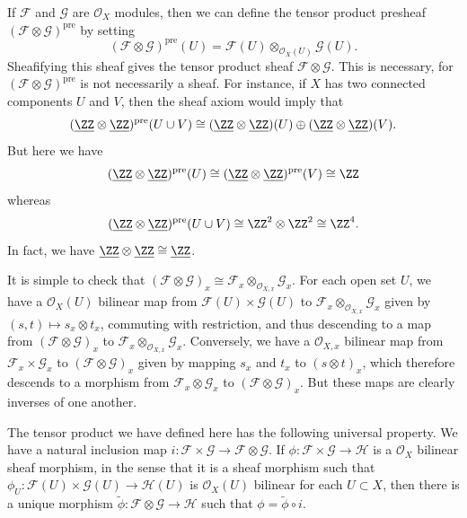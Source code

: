 \begin{example}
    If $\mathcal{F}$ and $\mathcal{G}$ are $\mathcal{O}_X$ modules, then we can define the tensor product presheaf $(\mathcal{F} \otimes \mathcal{G})^{\text{pre}}$ by setting
    \[ (\mathcal{F} \otimes \mathcal{G})^{\text{pre}}(U) = \mathcal{F}(U) \otimes_{\mathcal{O}_X(U)} \mathcal{G}(U). \]
    Sheafifying this sheaf gives the tensor product sheaf $\mathcal{F} \otimes \mathcal{G}$. This is necessary, for $(\mathcal{F} \otimes \mathcal{G})^{\text{pre}}$ is not necessarily a sheaf. For instance, if $X$ has two connected components $U$ and $V$, then the sheaf axiom would imply that
    \[ (\underline{\ZZ} \otimes \underline{\ZZ})^{\text{pre}}(U \cup V) \cong (\underline{\ZZ} \otimes \underline{\ZZ})(U) \oplus (\underline{\ZZ} \otimes \underline{\ZZ})(V). \]
    But here we have
    \[ (\underline{\ZZ} \otimes \underline{\ZZ})^{\text{pre}}(U) \cong (\underline{\ZZ} \otimes \underline{\ZZ})^{\text{pre}}(V) \cong \ZZ \]
    whereas
    \[ (\underline{\ZZ} \otimes \underline{\ZZ})^{\text{pre}}(U \cup V) \cong \ZZ^2 \otimes \ZZ^2 \cong \ZZ^4. \]
    In fact, we have $\underline{\ZZ} \otimes \underline{\ZZ} \cong \underline{\ZZ}$.

    It is simple to check that $(\mathcal{F} \otimes \mathcal{G})_x \cong \mathcal{F}_x \otimes_{\mathcal{O}_{X,x}} \mathcal{G}_x$. For each open set $U$, we have a $\mathcal{O}_X(U)$ bilinear map from $\mathcal{F}(U) \times \mathcal{G}(U)$ to $\mathcal{F}_x \otimes_{\mathcal{O}_{X,x}} \mathcal{G}_x$ given by $(s,t) \mapsto s_x \otimes t_x$, commuting with restriction, and thus descending to a map from $(\mathcal{F} \otimes \mathcal{G})_x$ to $\mathcal{F}_x \otimes_{\mathcal{O}_{X,x}} \mathcal{G}_x$. Conversely, we have a $\mathcal{O}_{X,x}$ bilinear map from $\mathcal{F}_x \times \mathcal{G}_x$ to $(\mathcal{F} \otimes \mathcal{G})_x$ given by mapping $s_x$ and $t_x$ to $(s \otimes t)_x$, which therefore descends to a morphism from $\mathcal{F}_x \otimes \mathcal{G}_x$ to $(\mathcal{F} \otimes \mathcal{G})_x$. But these maps are clearly inverses of one another.

    The tensor product we have defined here has the following universal property. We have a natural inclusion map $i: \mathcal{F} \times \mathcal{G} \to \mathcal{F} \otimes \mathcal{G}$. If $\phi: \mathcal{F} \times \mathcal{G} \to \mathcal{H}$ is a $\mathcal{O}_X$ bilinear sheaf morphism, in the sense that it is a sheaf morphism such that $\phi_U: \mathcal{F}(U) \times \mathcal{G}(U) \to \mathcal{H}(U)$ is $\mathcal{O}_X(U)$ bilinear for each $U \subset X$, then there is a unique morphism $\tilde{\phi}: \mathcal{F} \otimes \mathcal{G} \to \mathcal{H}$ such that $\phi = \tilde{\phi} \circ i$.
\end{example}

